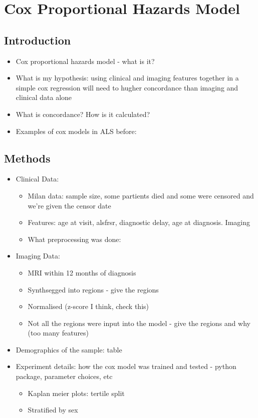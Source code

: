 \chapter{Cox Proportional Hazards Model}
\label{cox_proportional_hazards_model}

\section{Introduction}
\begin{itemize}
    \item Cox proportional hazards model - what is it?
    \item What is my hypothesis: using clinical and imaging features together in a simple cox regression will need to hugher concordance than imaging and clinical data alone
    \item What is concordance? How is it calculated?
    \item Examples of cox models in ALS before:
\end{itemize}

\section{Methods}
\begin{itemize}
    \item Clinical Data:
    \begin{itemize}
        \item Milan data: sample size, some partients died and some were censored and we're given the censor date
        \item Features: age at visit, alsfrsr, diagnostic delay, age at diagnosis. Imaging
        \item What preprocessing was done:
    \end{itemize}
    \item Imaging Data:
    \begin{itemize}
        \item MRI within 12 months of diagnosis
        \item Synthsegged into regions - give the regions
        \item Normalised (z-score I think, check this)
        \item Not all the regions were input into the model - give the regions and why (too many features)
    \end{itemize}
    \item Demographics of the sample: table
    \item Experiment details: how the cox model was trained and tested - python package, parameter choices, etc
    \begin{itemize}
        \item Kaplan meier plots: tertile split
        \item Stratified by sex
    \end{itemize}
\end{itemize}

